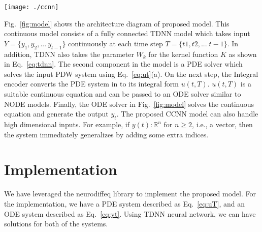 \documentclass{article}
\renewcommand{\Re}{\mathbb{R}}
\begin{document}
\begin{figure*}[htb]
    \centering
    \texttt{[image: ./ccnn]}
    \caption{The architecture diagram of proposed Continuous CNN model}
    \label{fig:model}
\end{figure*}

Fig.~\ref{fig:model} shows the architecture diagram of proposed model. This continuous model consists of a fully connected TDNN model which takes input $Y=\{y_1, y_2, ... \ y_{t-1}\}$ continuously at each time step $T =\{t1, t2, ... \; t-1\}$. In addition, TDNN also takes the parameter $W_k$ for the kernel function $K$ as shown in Eq.~\eqref{eq:tdnn}. The second component in the model is a PDE solver which solves the input PDW system using Eq.~\eqref{eq:ut}(a). On the next step, the Integral encoder converts the PDE system in to its integral form $u(t,T)$. $u(t,T)$ is a suitable continuous equation and can be passed to an ODE solver similar to NODE models. Finally, the ODE solver in Fig.~\ref{fig:model} solves the continuous equation and generate the output $y_t$.
The proposed CCNN model can also handle high dimensional inputs. For example,  if $y(t) : \Re^n$ for $n \geq 2$, i.e., a vector, then the system immediately generalizes by adding some extra indices.

\section*{Implementation}
We have leveraged the neurodiffeq \cite{chen2020neurodiffeq} library to implement the proposed model. For the implementation, we have a PDE system described as Eq.~\eqref{eq:uT}, and an ODE system described as Eq.~\eqref{eq:yt}. Using TDNN neural network, we can have solutions for both of the systems.
\end{document}
